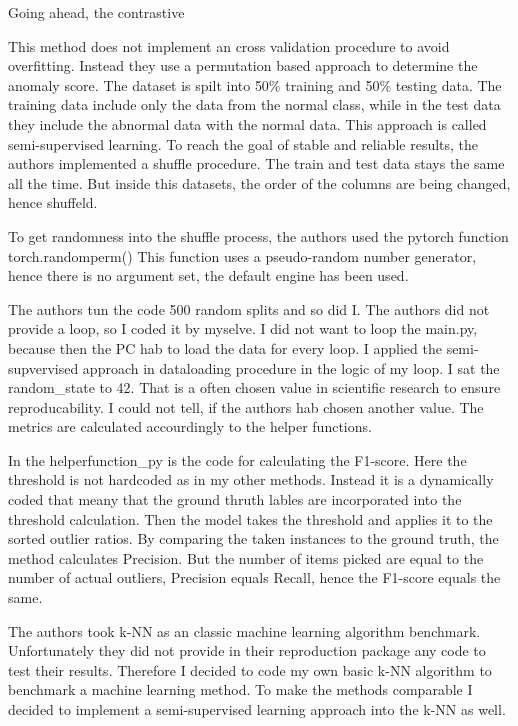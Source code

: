 Going ahead, the contrastive 


This method does not implement an cross validation procedure to avoid overfitting. 
Instead they use a permutation based approach to determine the anomaly score.
The dataset is spilt into 50\% training and 50\% testing data.
The training data include only the data from the normal class, while in the test data they include the abnormal data with the normal data. 
This approach is called semi-supervised learning.
To reach the goal of stable and reliable results, the authors implemented a shuffle procedure.
The train and test data stays the same all the time.
But inside this datasets, the order of the columns are being changed, hence shuffeld.

To get randomness into the shuffle process, the authors used the pytorch function torch.randomperm()
This function uses a pseudo-random number generator, hence there is no argument set, the default engine has been used.

The authors tun the code 500 random splits and so did I.
The authors did not provide a loop, so I coded it by myselve.
I did not want to loop the main.py, because then the PC hab to load the data for every loop. 
I applied the semi-supvervised approach in dataloading procedure in the logic of my loop.
I sat the random\_state to 42.
That is a often chosen value in scientific research to ensure reproducability.
I could not tell, if the authors hab chosen another value.  
The metrics are calculated accourdingly to the helper functions.


In the helperfunction\_py is the code for calculating the F1-score.
Here the threshold is not hardcoded as in my other methods.
Instead it is a dynamically coded that meany that the ground thruth lables are incorporated into the threshold calculation.
Then the model takes the threshold and applies it to the sorted outlier ratios.
By comparing the taken instances to the ground truth, the method calculates Precision.
But the number of items picked are equal to the number of actual outliers, Precision equals Recall, hence the F1-score equals the same. 


The authors took k-NN as an classic machine learning algorithm benchmark.
Unfortunately they did not provide in their reproduction package any code to test their results.
Therefore I decided to code my own basic k-NN algorithm to benchmark a machine learning method.
To make the methods comparable I decided to implement a semi-supervised learning approach into the k-NN as well.


